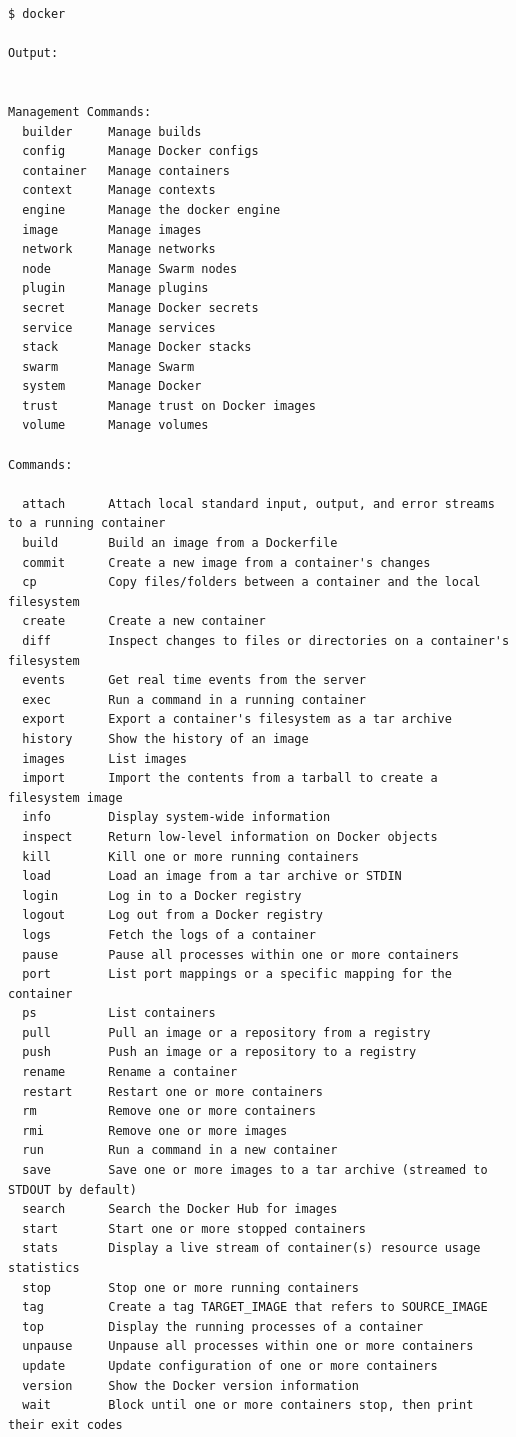 \documentclass{article}
\begin{document}
\begin{verbatim}
$ docker

Output:


Management Commands:
  builder     Manage builds
  config      Manage Docker configs
  container   Manage containers
  context     Manage contexts
  engine      Manage the docker engine
  image       Manage images
  network     Manage networks
  node        Manage Swarm nodes
  plugin      Manage plugins
  secret      Manage Docker secrets
  service     Manage services
  stack       Manage Docker stacks
  swarm       Manage Swarm
  system      Manage Docker
  trust       Manage trust on Docker images
  volume      Manage volumes

Commands:

  attach      Attach local standard input, output, and error streams to a running container
  build       Build an image from a Dockerfile
  commit      Create a new image from a container's changes
  cp          Copy files/folders between a container and the local filesystem
  create      Create a new container
  diff        Inspect changes to files or directories on a container's filesystem
  events      Get real time events from the server
  exec        Run a command in a running container
  export      Export a container's filesystem as a tar archive
  history     Show the history of an image
  images      List images
  import      Import the contents from a tarball to create a filesystem image
  info        Display system-wide information
  inspect     Return low-level information on Docker objects
  kill        Kill one or more running containers
  load        Load an image from a tar archive or STDIN
  login       Log in to a Docker registry
  logout      Log out from a Docker registry
  logs        Fetch the logs of a container
  pause       Pause all processes within one or more containers
  port        List port mappings or a specific mapping for the container
  ps          List containers
  pull        Pull an image or a repository from a registry
  push        Push an image or a repository to a registry
  rename      Rename a container
  restart     Restart one or more containers
  rm          Remove one or more containers
  rmi         Remove one or more images
  run         Run a command in a new container
  save        Save one or more images to a tar archive (streamed to STDOUT by default)
  search      Search the Docker Hub for images
  start       Start one or more stopped containers
  stats       Display a live stream of container(s) resource usage statistics
  stop        Stop one or more running containers
  tag         Create a tag TARGET_IMAGE that refers to SOURCE_IMAGE
  top         Display the running processes of a container
  unpause     Unpause all processes within one or more containers
  update      Update configuration of one or more containers
  version     Show the Docker version information
  wait        Block until one or more containers stop, then print their exit codes
\end{verbatim}
\end{document}
